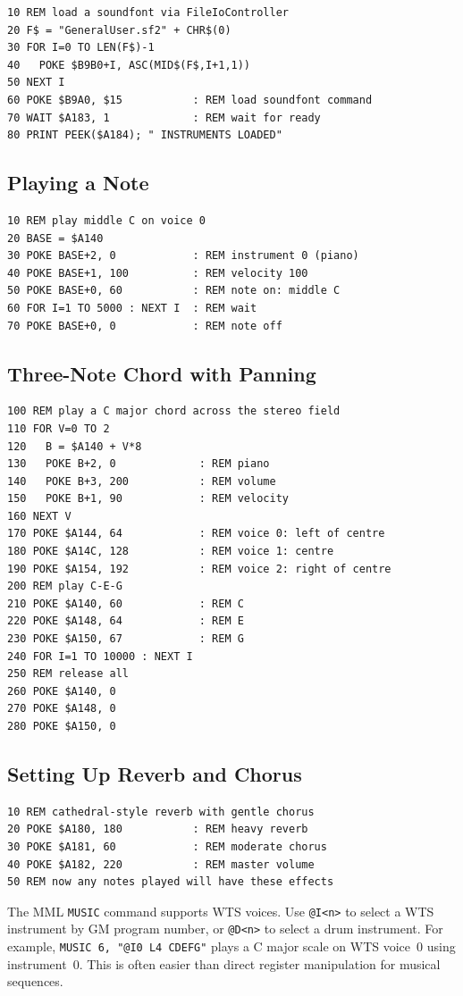 \begin{lstlisting}
10 REM load a soundfont via FileIoController
20 F$ = "GeneralUser.sf2" + CHR$(0)
30 FOR I=0 TO LEN(F$)-1
40   POKE $B9B0+I, ASC(MID$(F$,I+1,1))
50 NEXT I
60 POKE $B9A0, $15           : REM load soundfont command
70 WAIT $A183, 1             : REM wait for ready
80 PRINT PEEK($A184); " INSTRUMENTS LOADED"
\end{lstlisting}

\subsection{Playing a Note}

\begin{lstlisting}
10 REM play middle C on voice 0
20 BASE = $A140
30 POKE BASE+2, 0            : REM instrument 0 (piano)
40 POKE BASE+1, 100          : REM velocity 100
50 POKE BASE+0, 60           : REM note on: middle C
60 FOR I=1 TO 5000 : NEXT I  : REM wait
70 POKE BASE+0, 0            : REM note off
\end{lstlisting}

\subsection{Three-Note Chord with Panning}

\begin{lstlisting}
100 REM play a C major chord across the stereo field
110 FOR V=0 TO 2
120   B = $A140 + V*8
130   POKE B+2, 0             : REM piano
140   POKE B+3, 200           : REM volume
150   POKE B+1, 90            : REM velocity
160 NEXT V
170 POKE $A144, 64            : REM voice 0: left of centre
180 POKE $A14C, 128           : REM voice 1: centre
190 POKE $A154, 192           : REM voice 2: right of centre
200 REM play C-E-G
210 POKE $A140, 60            : REM C
220 POKE $A148, 64            : REM E
230 POKE $A150, 67            : REM G
240 FOR I=1 TO 10000 : NEXT I
250 REM release all
260 POKE $A140, 0
270 POKE $A148, 0
280 POKE $A150, 0
\end{lstlisting}

\subsection{Setting Up Reverb and Chorus}

\begin{lstlisting}
10 REM cathedral-style reverb with gentle chorus
20 POKE $A180, 180           : REM heavy reverb
30 POKE $A181, 60            : REM moderate chorus
40 POKE $A182, 220           : REM master volume
50 REM now any notes played will have these effects
\end{lstlisting}

\begin{tipbox}
The MML \texttt{MUSIC} command supports WTS voices.  Use \texttt{@I\textless n\textgreater}
to select a WTS instrument by GM program number, or \texttt{@D\textless n\textgreater}
to select a drum instrument.  For example, \texttt{MUSIC 6, "@I0 L4 CDEFG"} plays
a C major scale on WTS voice~0 using instrument~0.  This is often easier than
direct register manipulation for musical sequences.
\end{tipbox}
